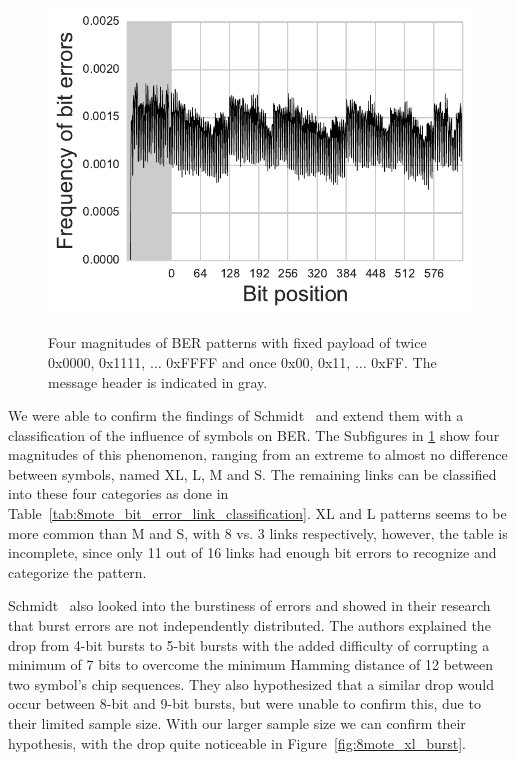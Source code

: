 \begin{figure}[t]
{	    \includegraphics[width=0.475\columnwidth]{figures/8mote_2-7_xor}
	    \label{fig:8mote_bit_errors_s}
	}
	\caption{Four magnitudes of \acs{BER} patterns with fixed payload of twice 0x0000, 0x1111, $\ldots$ 0xFFFF and once 0x00, 0x11, $\ldots$ 0xFF. The message header is indicated in gray.}
	\label{fig:8mote_bit_errors}
\end{figure}

We were able to confirm the findings of Schmidt~\etal{} and extend them with a classification of the influence of symbols on \ac{BER}.
The Subfigures in \ref{fig:8mote_bit_errors} show four magnitudes of this phenomenon, ranging from an extreme to almost no difference between symbols, named XL, L, M and S.
The remaining links can be classified into these four categories as done in Table~\ref{tab:8mote_bit_error_link_classification}.
XL and L patterns seems to be more common than M and S, with 8 vs. 3 links respectively, however, the table is incomplete, since only 11 out of 16 links had enough bit errors to recognize and categorize the pattern.

Schmidt~\etal{} also looked into the burstiness of errors and showed in their research that burst errors are not independently distributed.
The authors explained the drop from 4-bit bursts to 5-bit bursts with the added difficulty of corrupting a minimum of 7 bits to overcome the minimum Hamming distance of 12 between two symbol's chip sequences.
They also hypothesized that a similar drop would occur between 8-bit and 9-bit bursts, but were unable to confirm this, due to their limited sample size.
With our larger sample size we can confirm their hypothesis, with the drop quite noticeable in Figure~\ref{fig:8mote_xl_burst}.

